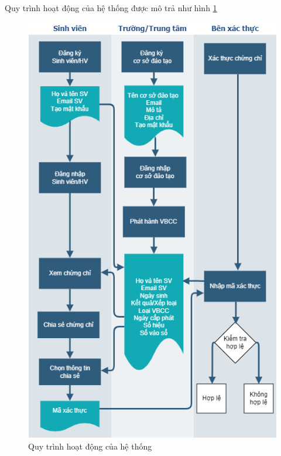 Quy trình hoạt động của hệ thống được mô trả như hình \ref{fig:vbcc_diagram}

\begin{figure}[htbp]
\centering
\includegraphics[width=.9\linewidth]{img/vbcc_diagram2.png}
\caption{Quy trình hoạt động của hệ thống}
\label{fig:vbcc_diagram}
\end{figure}

